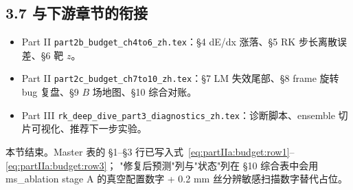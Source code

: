 \subsection*{3.7 与下游章节的衔接}

\begin{itemize}
  \item Part II \texttt{part2b\_budget\_ch4to6\_zh.tex}：§4 dE/dx 涨落、§5 RK 步长离散误差、§6 靶 $z$。
  \item Part II \texttt{part2c\_budget\_ch7to10\_zh.tex}：§7 LM 失效尾部、§8 frame 旋转 bug 复盘、§9 $B$ 场地图、§10 综合对账。
  \item Part III \texttt{rk\_deep\_dive\_part3\_diagnostics\_zh.tex}：诊断脚本、ensemble 切片可视化、推荐下一步实验。
\end{itemize}

本节结束。Master 表的 §1--§3 行已写入式~\eqref{eq:partIIa:budget:row1}--\eqref{eq:partIIa:budget:row3}；
"修复后预测"列与"状态"列在 §10 综合表中会用 ms\_ablation stage A 的真空配置数字 + 0.2 mm 丝分辨敏感扫描数字替代占位。
